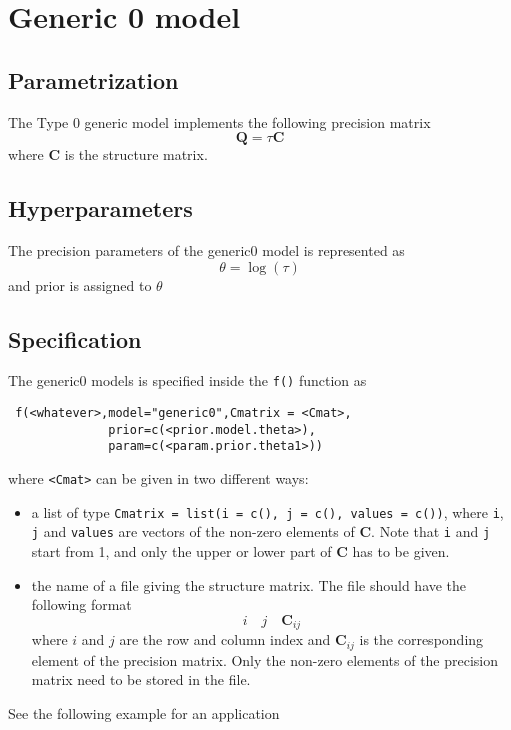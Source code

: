 \documentclass[a4paper,11pt]{article}
\begin{document}
\section*{Generic 0 model}

\subsection*{Parametrization}

The Type 0 generic model implements the following precision matrix
\begin{displaymath}
    \mathbf{Q}=\tau\mathbf{C}
\end{displaymath}
where $\mathbf{C}$ is the structure matrix.

\subsection*{Hyperparameters}

The precision parameters of the generic0 model is represented as
\begin{displaymath}
    \theta = \log(\tau)
\end{displaymath}
and prior is assigned to $\theta$

\subsection*{Specification}

The generic0 models is specified inside the {\tt f()} function as
\begin{verbatim}
 f(<whatever>,model="generic0",Cmatrix = <Cmat>,
              prior=c(<prior.model.theta>),
              param=c(<param.prior.theta1>))
\end{verbatim}


where {\tt <Cmat>} can be given in two different ways:
\begin{itemize}
\item a list of type {\tt Cmatrix = list(i = c(), j = c(), values =
        c())}, where {\tt i}, {\tt j} and {\tt values} are vectors of the
    non-zero elements of $\mathbf{C}$. Note that {\tt i} and {\tt j}
    start from 1, and only the upper or lower part of $\mathbf{C}$ has
    to be given.
\item the name of a file giving the structure matrix. The file should
    have the following format
    \[
    i\quad j\quad \mathbf{C}_{ij}
    \]
    where $i$ and $j$ are the row and column index and
    $\mathbf{C}_{ij}$ is the corresponding element of the precision
    matrix. Only the non-zero elements of the precision matrix need to
    be stored in the file.  
\end{itemize}
See the following example for an application
\end{document}

